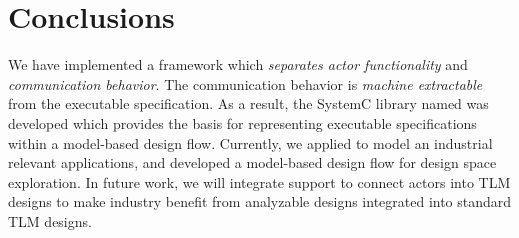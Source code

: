 \section{Conclusions}\label{sec:conclusions}

We have implemented a framework which \emph{separates actor functionality} and \emph{communication behavior}.
The communication behavior is \emph{machine extractable} from the executable specification.
As a result, the SystemC library named \SysteMoC{} was developed which provides the basis for representing executable specifications within a model-based design flow.
Currently, we applied \SysteMoC{} to model an industrial relevant applications, and developed a model-based design flow for design space exploration.
In future work, we will integrate support to connect \SysteMoC{} actors into TLM designs to make industry benefit from analyzable \SysteMoC{} designs integrated into standard TLM designs.


